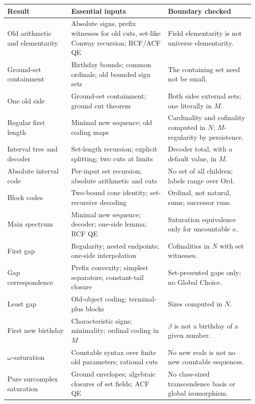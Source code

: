\documentclass[11pt,letterpaper]{article}
\numberwithin{equation}{section}
\theoremstyle{definition}
\theoremstyle{remark}
\newcommand{\Ord}{\mathrm{Ord}}
\begin{document}
{\small
\begin{longtable}{@{}P{0.27\textwidth}P{0.36\textwidth}P{0.29\textwidth}@{}}
\toprule
Result & Essential inputs & Boundary checked\\
\midrule
\endhead
Old arithmetic and elementarity & Absolute signs, prefix witnesses for old cuts, set-like Conway recursion; RCF/ACF QE & Field elementarity is not universe elementarity.\\[3pt]
Ground-set containment & Birthday bounds; common ordinals; old bounded sign sets & The containing set need not be small.\\[3pt]
One old side & Ground-set containment; ground cut theorem & Both sides external sets; one literally in $M$.\\[3pt]
Regular first length & Minimal new sequence; old coding maps & Cardinality and cofinality computed in $N$; $M$-regularity by persistence.\\[3pt]
Interval tree and decoder & Set-length recursion; explicit splitting; two cuts at limits & Decoder total, with a default value, in $M$.\\[3pt]
Absolute interval code & Per-input set recursion; absolute arithmetic and cuts & No set of all children; labels range over $\Ord$.\\[3pt]
Block codes & Two-bound cone identity; set-recursive decoding & Ordinal, not natural, sums; successor runs.\\[3pt]
Main spectrum & Minimal new sequence; decoder; one-side lemma; RCF QE & Saturation equivalence only for uncountable $\kappa$.\\[3pt]
First gap & Regularity; nested endpoints; one-side interpolation & Cofinalities in $N$ with set witnesses.\\[3pt]
Gap correspondence & Prefix convexity; simplest separators; constant-tail closure & Set-presented gaps only; no Global Choice.\\[3pt]
Least gap & Old-object coding; terminal-plus blocks & Sizes computed in $N$.\\[3pt]
First new birthday & Characteristic signs; minimality; ordinal coding in $M$ & $\beta$ is not a birthday of a given number.\\[3pt]
$\omega$-saturation & Countable syntax over finite old parameters; rational cuts & No new reals is not no new countable sequences.\\[3pt]
Pure surcomplex saturation & Ground envelopes; algebraic closures of set fields; ACF QE & No class-sized transcendence basis or global isomorphism.\\[3pt]

\end{longtable}}
\end{document}
